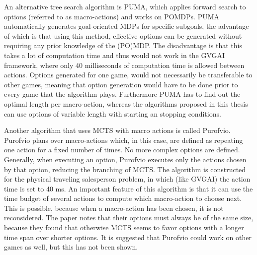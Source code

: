 An alternative tree search algorithm is PUMA, which applies forward search to
options (referred to as macro-actions) and works on POMDPs.  PUMA automatically
generates goal-oriented MDPs for specific subgoals, the advantage of which is
that using this method, effective options can be generated without requiring any
prior knowledge of the (PO)MDP. The disadvantage is that this takes a lot of
computation time and thus would not work in the GVGAI framework, where only 40
milliseconds of computation time is allowed between actions. Options generated
for one game, would not necessarily be transferable to other games, meaning that
option generation would have to be done prior to every game that the algorithm
plays. Furthermore PUMA has to find out the optimal length per macro-action,
whereas the algorithms proposed in this thesis can use options of variable
length with starting an stopping conditions.

Another algorithm that uses MCTS with macro actions is called Purofvio.
Purofvio plans over macro-actions which, in this case, are defined as repeating
one action for a fixed number of times. No more complex options are defined.
Generally, when executing an option, Purofvio executes only the actions chosen
by that option, reducing the branching of MCTS. The algorithm is constructed for
the physical traveling salesperson problem, in which (like GVGAI) the action
time is set to 40 ms. An important feature of this algorithm is that it can use
the time budget of several actions to compute which macro-action to choose next.
This is possible, because when a macro-action has been chosen, it is not
reconsidered. The paper notes that their options must always be of the same
size, because they found that otherwise MCTS seems to favor options with a
longer time span over shorter options. It is suggested that Purofvio could work
on other games as well, but this has not been shown.
